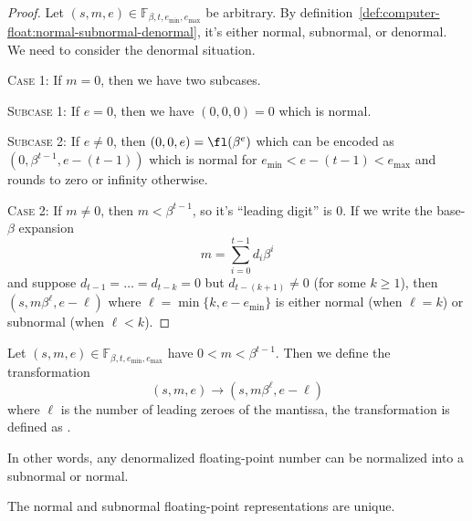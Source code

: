 \begin{proof}
  Let  $(s,m,e)\in\mathbb{F}_{\beta,t,e_{\text{min}},e_{\text{max}}}$ be
  arbitrary. By
  definition~\ref{def:computer-float:normal-subnormal-denormal},
  it's either normal, subnormal, or denormal. We need to consider the
  denormal situation.

  \textsc{Case 1:} If $m=0$, then we have two subcases.

  {}\quad\textsc{Subcase 1:} If $e=0$, then we have $(0,0,0)=0$ which is
  normal.

  {}\quad\textsc{Subcase 2:} If $e\neq0$, then $(0,0,e)=\fl(\beta^{e})$
  which can be encoded as $(0,\beta^{t-1}, e-(t-1))$ which is normal for
  $e_{\text{min}}<e-(t-1)<e_{\text{max}}$ and rounds to zero or infinity
  otherwise.
  
  \textsc{Case 2:} If $m\neq0$, then $m<\beta^{t-1}$, so it's ``leading
  digit'' is 0. If we write the base-$\beta$ expansion
  \begin{equation}
    m=\sum^{t-1}_{i=0}d_{i}\beta^{i}
  \end{equation}
  and suppose $d_{t-1}=\dots=d_{t-k}=0$ but $d_{t-(k+1)}\neq0$ (for some
  $k\geq1$), then $(s,m\beta^{\ell},e-\ell)$ where $\ell=\min\{k,e-e_{\text{min}}\}$
  is either normal (when $\ell=k$) or subnormal (when $\ell<k$).
\end{proof}
\begin{defn}
Let $(s,m,e)\in\mathbb{F}_{\beta,t,e_{\text{min}},e_{\text{max}}}$
have $0<m<\beta^{t-1}$. Then we define the transformation
\begin{equation}
  (s,m,e)\to(s,m\beta^{\ell},e-\ell)
\end{equation}
where $\ell$ is the number of leading zeroes of the mantissa, the
transformation is defined as .
\end{defn}
\begin{rmk}
In other words, any denormalized floating-point number can be normalized
into a subnormal or normal.
\end{rmk}
\begin{thm}
The normal and subnormal floating-point representations are unique.
\end{thm}

